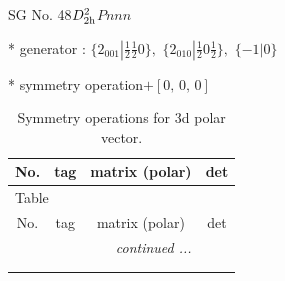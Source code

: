 \documentclass[fleqn,8pt]{jsarticle}
\begin{document}
\setcounter{MaxMatrixCols}{32}

\renewcommand{\tablename}{Table~}
\renewcommand{\figurename}{Figure~}
\begin{center}
\LARGE
SG No. 48\quad$D_{\rm 2h}^{2}$\quad$Pnnn$\quad[ orthorhombic ]
\end{center}

* generator : $\{2{}_{001}|\frac{1}{2} \frac{1}{2} 0\},\,\,\{2{}_{010}|\frac{1}{2} 0 \frac{1}{2}\},\,\,\{-1|0\}$

* symmetry operation\quad$+\left[ 0,\, 0,\, 0 \right]$
\renewcommand{\arraystretch}{1.3}
\begin{longtable}{cccc}
\caption{Symmetry operations for 3d polar vector.}
 \\
 \hline \hline
No. & tag & matrix (polar) & det \\ \hline \endfirsthead

\multicolumn{3}{l}{\tablename\ \thetable{}} \\
 \hline \hline
No. & tag & matrix (polar) & det \\ \hline \endhead

 \hline \hline
\multicolumn{3}{r}{\footnotesize\it continued ...} \\ \endfoot

 \hline \hline
\multicolumn{3}{r}{} \\ \endlastfoot


\end{longtable}
\end{document}
